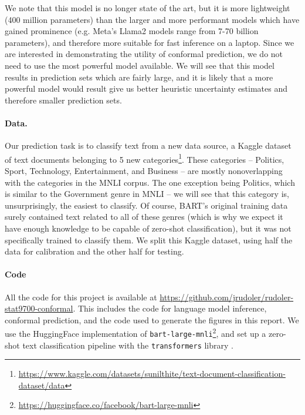 \documentclass[a4paper, 12pt]{article}
\begin{document}
We note that this model is no longer state of the art, but it is more lightweight (400 million parameters) than the larger and more performant models which have gained prominence (e.g. Meta's Llama2 models range from 7-70 billion parameters), and therefore more suitable for fast inference on a laptop.
Since we are interested in demonstrating the utility of conformal prediction, we do not need to use the most powerful model available.
We will see that this model results in prediction sets which are fairly large, and it is likely that a more powerful model would result give us better heuristic uncertainty estimates and therefore smaller prediction sets.


\paragraph*{Data.} Our prediction task is to classify text from a new data source, a Kaggle dataset of text documents belonging to 5 new categories\footnote{\url{https://www.kaggle.com/datasets/sunilthite/text-document-classification-dataset/data}}. These categories -- Politics, Sport, Technology, Entertainment, and Business -- are mostly nonoverlapping with the categories in the MNLI corpus. The one exception being Politics, which is similar to the Government genre in MNLI -- we will see that this category is, unsurprisingly, the easiest to classify. Of course, BART's original training data surely contained text related to all of these genres (which is why we expect it have enough knowledge to be capable of zero-shot classification), but it was not specifically trained to classify them. We split this Kaggle dataset, using half the data for calibration and the other half for testing.

\paragraph*{Code} All the code for this project is available at \url{https://github.com/jrudoler/rudoler-stat9700-conformal}. This includes the code for language model inference, conformal prediction, and the code used to generate the figures in this report. We use the HuggingFace implementation of \texttt{bart-large-mnli}\footnote{\url{https://huggingface.co/facebook/bart-large-mnli}}, and set up a zero-shot text classification pipeline with the \texttt{transformers} library \autocite{wolfHuggingFaceTransformersStateoftheart2019}.
\end{document}
